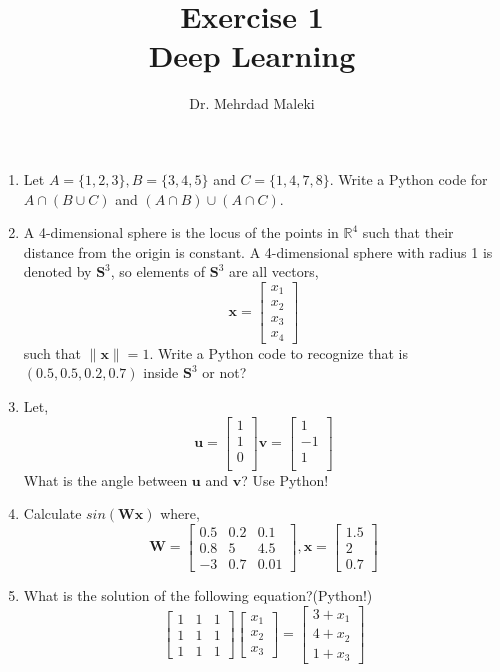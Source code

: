 \documentclass[12pt,a4paper]{article} %
\title{Exercise 1\\ Deep Learning}
\author{Dr. Mehrdad Maleki}
\date{}
\begin{document}
\maketitle
\begin{enumerate}

\item Let $A=\{1,2,3\}, B=\{3,4,5\}$ and $C=\{1,4,7,8\}$. Write a Python code for $A\cap (B\cup C)$ and $(A\cap B)\cup (A\cap C)$.

\item A 4-dimensional sphere is the locus of the points in $\mathbb{R}^4$ such that their distance from the origin is constant. A 4-dimensional sphere with radius 1 is denoted by $\mathbf{S}^3$, so elements of $\mathbf{S}^3$ are all vectors,
\[\mathbf{x}=
\begin{bmatrix}
x_1\\
x_2\\
x_3\\
x_4
\end{bmatrix}
\]
such that $\|\mathbf{x}\|=1$. Write a Python code to recognize that is $(0.5,0.5,0.2,0.7)$ inside $\mathbf{S}^3$ or not?

\item Let,
\[
\mathbf{u}=
\begin{bmatrix}
1\\
1\\
0\\
\end{bmatrix}
\mathbf{v}=
\begin{bmatrix}
1\\
-1\\
1\\
\end{bmatrix}
\]
What is the angle between $\mathbf{u}$ and $\mathbf{v}$? Use Python!

\item Calculate $sin(\mathbf{W}\mathbf{x})$ where,
\[\mathbf{W}=
\begin{bmatrix}
0.5 & 0.2 & 0.1\\
0.8 & 5 & 4.5\\
-3 & 0.7 & 0.01
\end{bmatrix}, \mathbf{x}=
\begin{bmatrix}
1.5\\
2\\
0.7
\end{bmatrix}
\]

\item What is the solution of the following equation?(Python!)
\[
\begin{bmatrix}
1 & 1 & 1\\
1 & 1 & 1\\
1 & 1 & 1
\end{bmatrix}
\begin{bmatrix}
x_1\\
x_2\\
x_3
\end{bmatrix}=
\begin{bmatrix}
3+x_1\\
4+x_2\\
1+x_3
\end{bmatrix}
\]


\end{enumerate}
\end{document}
